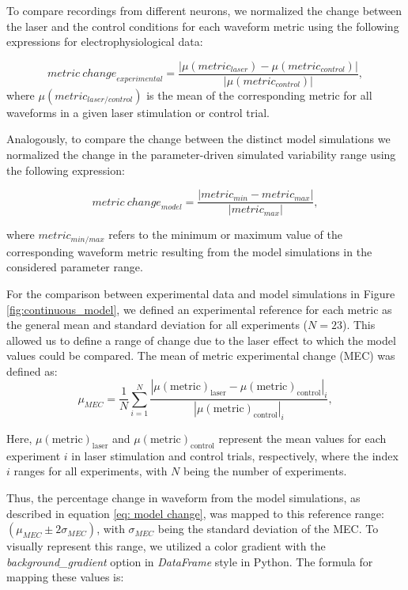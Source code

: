 To compare recordings from different neurons, we normalized the change between the laser and the control conditions for each waveform metric using the following expressions for electrophysiological data:

\begin{equation}
	{metric\ change}_{experimental} = \frac{|\mu(metric_{laser}) - \mu(metric_{control})|}{|\mu(metric_{control})|},
\end{equation}
\noindent where $\mu(metric_{laser/control})$ is the mean of the corresponding metric for all waveforms in a given laser stimulation or control trial.

Analogously, to compare the change between the distinct model simulations we normalized the change in the parameter-driven simulated variability range using the following expression:

\begin{equation}
	\label{eq: model change}
	{metric\ change}_{model} = \frac{|metric_{min} - metric_{max}|}{|metric_{max}|},
\end{equation}

\noindent where $metric_{min/max}$ refers to the minimum or maximum value of the corresponding waveform metric resulting from the model simulations in the  considered parameter range.


For the comparison between experimental data and model simulations in Figure \ref{fig:continuous_model}, we defined an experimental reference for each metric as the general mean and standard deviation for all experiments ($N=23$). This allowed us to define a range of change due to the laser effect to which the model values could be compared. The mean of metric experimental change (MEC) was defined as:
\begin{equation}
	\mu_{MEC} = \frac{1}{N}\sum_{i=1}^{N}\frac{|\mu(\text{metric})_{\text{laser}} - \mu(\text{metric})_{\text{control}}|_{i}}{|\mu(\text{metric})_{\text{control}}|_{i}},
\end{equation}

Here, $\mu(\text{metric})_{\text{laser}}$ and $\mu(\text{metric})_{\text{control}}$ represent the mean values for each experiment $i$ in laser stimulation and control trials, respectively, where the index $i$ ranges for all experiments, with $N$ being the number of experiments.

Thus, the percentage change in waveform from the model simulations, as described in equation \ref{eq: model change}, was mapped to this reference range: $(\mu_{MEC}\pm2\sigma_{MEC})$, with $\sigma_{MEC}$ being the standard deviation of the MEC. To visually represent this range, we utilized a color gradient with the \textit{background\_gradient} option in \textit{DataFrame} style in Python. The formula for mapping these values is:

